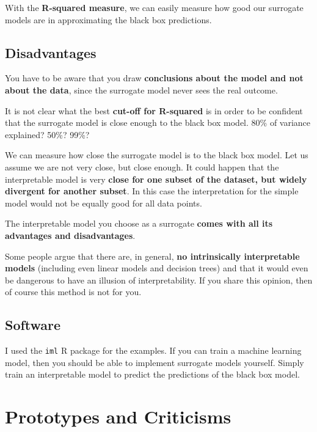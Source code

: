 \documentclass[
  12pt,
]{krantz}
\begin{document}
With the \textbf{R-squared measure}, we can easily measure how good our surrogate models are in approximating the black box predictions.

\hypertarget{disadvantages-10}{%
\subsection{Disadvantages}\label{disadvantages-10}}

You have to be aware that you draw \textbf{conclusions about the model and not about the data}, since the surrogate model never sees the real outcome.

It is not clear what the best \textbf{cut-off for R-squared} is in order to be confident that the surrogate model is close enough to the black box model.
80\% of variance explained? 50\%? 99\%?

We can measure how close the surrogate model is to the black box model.
Let us assume we are not very close, but close enough.
It could happen that the interpretable model is very \textbf{close for one subset of the dataset, but widely divergent for another subset}.
In this case the interpretation for the simple model would not be equally good for all data points.

The interpretable model you choose as a surrogate \textbf{comes with all its advantages and disadvantages}.

Some people argue that there are, in general, \textbf{no intrinsically interpretable models} (including even linear models and decision trees) and that it would even be dangerous to have an illusion of interpretability.
If you share this opinion, then of course this method is not for you.

\hypertarget{software-3}{%
\subsection{Software}\label{software-3}}

I used the \texttt{iml} R package for the examples.
If you can train a machine learning model, then you should be able to implement surrogate models yourself.
Simply train an interpretable model to predict the predictions of the black box model.

\newpage

\hypertarget{proto}{%
\section{Prototypes and Criticisms}\label{proto}}
\end{document}
